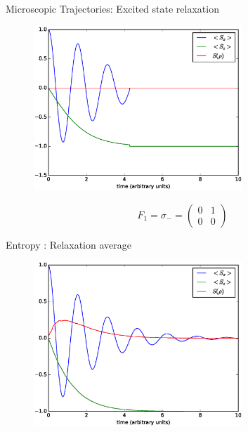 \documentclass{beamer}
\begin{document}
\begin{frame}{Microscopic Trajectories: Excited state relaxation}
	
	\begin{figure}[!htb]
		\centering
		\includegraphics[width=0.7\textwidth]{figs/relaxation_1.eps}
	\end{figure}
		\begin{equation*}
		F_1 = \sigma_- =
		\begin{pmatrix}
		0 & 1 \\
		0 & 0 
		\end{pmatrix}
		\end{equation*}
\end{frame}
\begin{frame}{Entropy : Relaxation average}
	\begin{figure}[h]
		\centering
		\includegraphics[width=0.7\textwidth]{figs/relaxation_1000.eps}
	\end{figure}
\end{frame}
\end{document}
